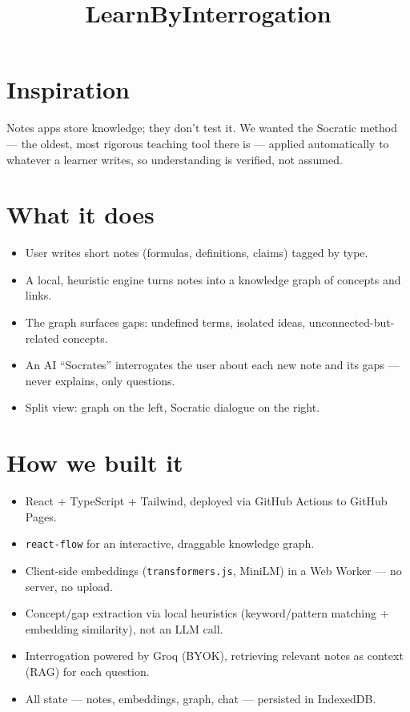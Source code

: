\documentclass[11pt]{article}
\title{LearnByInterrogation}
\author{}
\date{}
\begin{document}
\maketitle

\section*{Inspiration}
Notes apps store knowledge; they don't test it. We wanted the Socratic method — the oldest, most rigorous teaching tool there is — applied automatically to whatever a learner writes, so understanding is verified, not assumed.

\section*{What it does}
\begin{itemize}
  \item User writes short notes (formulas, definitions, claims) tagged by type.
  \item A local, heuristic engine turns notes into a knowledge graph of concepts and links.
  \item The graph surfaces gaps: undefined terms, isolated ideas, unconnected-but-related concepts.
  \item An AI ``Socrates'' interrogates the user about each new note and its gaps — never explains, only questions.
  \item Split view: graph on the left, Socratic dialogue on the right.
\end{itemize}

\section*{How we built it}
\begin{itemize}
  \item React + TypeScript + Tailwind, deployed via GitHub Actions to GitHub Pages.
  \item \texttt{react-flow} for an interactive, draggable knowledge graph.
  \item Client-side embeddings (\texttt{transformers.js}, MiniLM) in a Web Worker — no server, no upload.
  \item Concept/gap extraction via local heuristics (keyword/pattern matching + embedding similarity), not an LLM call.
  \item Interrogation powered by Groq (BYOK), retrieving relevant notes as context (RAG) for each question.
  \item All state — notes, embeddings, graph, chat — persisted in IndexedDB.
\end{itemize}
\end{document}
